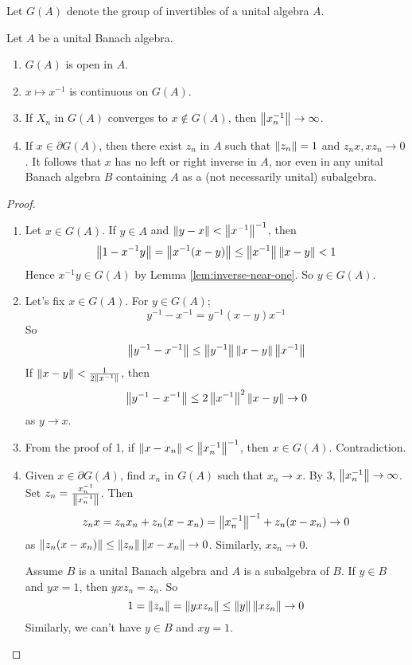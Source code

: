 \documentclass{article}
\begin{document}
\begin{notation}
  Let $G(A)$ denote the group of invertibles of a unital algebra $A$.
\end{notation}

\begin{cor}\label{cor:invertibles}
  Let $A$ be a unital Banach algebra.
  \begin{enumerate}
    \item $G(A)$ is open in $A$.
    \item $x \mapsto x^{-1}$ is continuous on $G(A)$.
    \item If $X_n$ in $G(A)$ converges to $x \nin G(A)$, then $\left\lVert x_n^{-1}\right\rVert \to \infty$.
    \item If $x \in \partial G(A)$, then there exist $z_n$ in $A$ such that $\left\lVert z_n\right\rVert = 1$ and $z_nx, xz_n \to 0$. It follows that $x$ has no left or right inverse in $A$, nor even in any unital Banach algebra $B$ containing $A$ as a (not necessarily unital) subalgebra.
  \end{enumerate}
\end{cor}
\begin{proof}~
  \begin{enumerate}
    \item Let $x \in G(A)$. If $y \in A$ and $\left\lVert y - x\right\rVert < \left\lVert x^{-1}\right\rVert^{-1}$, then
    $$\left\lVert 1 - x^{-1}y\right\rVert = \left\lVert x^{-1}(x - y)\right\rVert \le \left\lVert x^{-1}\right\rVert\left\lVert x - y\right\rVert < 1$$
    Hence $x^{-1}y \in G(A)$ by Lemma \ref{lem:inverse-near-one}. So $y \in G(A)$.
    \item Let's fix $x \in G(A)$. For $y \in G(A)$;
    $$y^{-1} - x^{-1} = y^{-1}(x - y)x^{-1}$$
    So
    $$\left\lVert y^{-1} - x^{-1}\right\rVert \le \left\lVert y^{-1}\right\rVert\left\lVert x - y\right\rVert\left\lVert x^{-1}\right\rVert$$
    If $\left\lVert x - y\right\rVert < \frac 1{2\left\lVert x^{-1}\right\rVert}$, then
    $$\left\lVert y^{-1} - x^{-1}\right\rVert \le 2\left\lVert x^{-1}\right\rVert^2\left\lVert x - y\right\rVert \to 0$$
    as $y \to x$.
    \item From the proof of 1, if $\left\lVert x - x_n\right\rVert < \left\lVert x_n^{-1}\right\rVert^{-1}$, then $x \in G(A)$. Contradiction.
    \item Given $x \in \partial G(A)$, find $x_n$ in $G(A)$ such that $x_n \to x$. By 3, $\left\lVert x_n^{-1}\right\rVert \to \infty$. Set $z_n = \frac{x_n^{-1}}{\left\lVert x_n^{-1}\right\rVert}$. Then
    $$z_nx = z_n x_n + z_n(x - x_n) = \left\lVert x_n^{-1}\right\rVert^{-1} + z_n(x - x_n) \to 0$$
    as $\left\lVert z_n(x - x_n)\right\rVert \le \left\lVert z_n\right\rVert\left\lVert x - x_n\right\rVert \to 0$. Similarly, $xz_n \to 0$.

    Assume $B$ is a unital Banach algebra and $A$ is a subalgebra of $B$. If $y \in B$ and $yx = 1$, then $yxz_n = z_n$. So
    $$1 = \left\lVert z_n\right\rVert = \left\lVert yxz_n\right\rVert \le \left\lVert y\right\rVert\left\lVert xz_n\right\rVert \to 0$$
    Similarly, we can't have $y \in B$ and $xy = 1$.
  \end{enumerate}
\end{proof}
\end{document}

